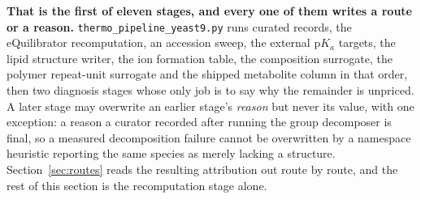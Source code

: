 \textbf{That is the first of eleven stages, and every one of them writes a route or a
reason.} \texttt{thermo\_pipeline\_}\allowbreak\texttt{yeast9.py} runs curated records, the eQuilibrator
recomputation, an accession sweep, the external p$K_a$ targets, the lipid structure writer,
the ion formation table, the composition surrogate, the polymer repeat-unit surrogate and
the shipped metabolite column in that order, then two diagnosis stages whose only job is to
say why the remainder is unpriced. A later stage may overwrite an earlier stage's
\emph{reason} but never its value, with one exception: a reason a curator recorded after
running the group decomposer is final, so a measured decomposition failure cannot be
overwritten by a namespace heuristic reporting the same species as merely lacking a
structure. Section~\ref{sec:routes} reads the resulting attribution out route by route, and
the rest of this section is the recomputation stage alone.

